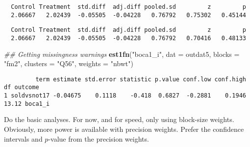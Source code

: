 \documentclass[11pt,]{article}
\newenvironment{Shaded}{\begin{snugshade}}{\end{snugshade}}
\newcommand{\CommentTok}[1]{\textcolor[rgb]{0.56,0.35,0.01}{\textit{#1}}}
\newcommand{\DataTypeTok}[1]{\textcolor[rgb]{0.13,0.29,0.53}{#1}}
\newcommand{\KeywordTok}[1]{\textcolor[rgb]{0.13,0.29,0.53}{\textbf{#1}}}
\newcommand{\NormalTok}[1]{#1}
\newcommand{\OperatorTok}[1]{\textcolor[rgb]{0.81,0.36,0.00}{\textbf{#1}}}
\newcommand{\StringTok}[1]{\textcolor[rgb]{0.31,0.60,0.02}{#1}}
\begin{document}
\begin{verbatim}
  Control Treatment  std.diff  adj.diff pooled.sd         z         p 
  2.06667   2.02439  -0.05505  -0.04228   0.76792   0.75302   0.45144 
\end{verbatim}

\begin{Shaded}
\end{Shaded}

\begin{verbatim}
  Control Treatment  std.diff  adj.diff pooled.sd         z         p 
  2.06667   2.02439  -0.05505  -0.04228   0.76792   0.70416   0.48133 
\end{verbatim}

\begin{Shaded}
\begin{Highlighting}[]
\CommentTok{## Getting missingness warnings}
\KeywordTok{est1fn}\NormalTok{(}\StringTok{"boca1_i"}\NormalTok{, }\DataTypeTok{dat =}\NormalTok{ outdat5, }\DataTypeTok{blocks =} \StringTok{"fm2"}\NormalTok{, }\DataTypeTok{clusters =} \StringTok{"Q56"}\NormalTok{, }\DataTypeTok{weights =} \StringTok{"nbwt"}\NormalTok{)}
\end{Highlighting}
\end{Shaded}

\begin{verbatim}
         term estimate std.error statistic p.value conf.low conf.high    df outcome
1 soldvsnot17 -0.04675    0.1118    -0.418  0.6827  -0.2881    0.1946 13.12 boca1_i
\end{verbatim}

\normalsize

Do the basic analyses. For now, and for speed, only using block-size
weights. Obviously, more power is available with precision weights.
Prefer the confidence intervals and \(p\)-value from the precision
weights.

\scriptsize
\end{document}
